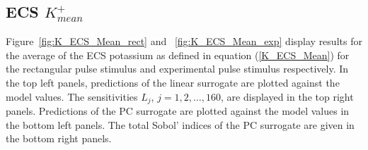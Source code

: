 \subsection{ECS $K^+_{mean}$}
\label{sec:qoi_K_ECS_Mean}

Figure~\ref{fig:K_ECS_Mean_rect} and ~\ref{fig:K_ECS_Mean_exp} display results for the average of the ECS potassium as defined in equation (\ref{K_ECS_Mean}) for the rectangular pulse stimulus and experimental pulse stimulus respectively. In the top left panels, predictions of the linear surrogate are plotted against the model values. The sensitivities $L_j$, $j=1,2,\dots,160$, are displayed in the top right panels. Predictions of the PC surrogate are plotted against the model values in the bottom left panels. The total Sobol' indices of the PC surrogate are given in the bottom right panels. 

